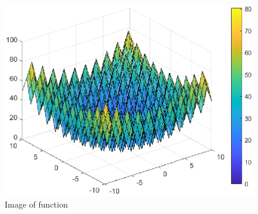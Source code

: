 \documentclass{CSArticle}[english]
\begin{document}
\begin{figure}[h!]
\centering
\includegraphics[scale=0.4]{figure/Q2-rastrigin.eps}
\caption{Image of function }
\label{fig:Q1_crite}
\end{figure}\par


\newpage
\end{document}

